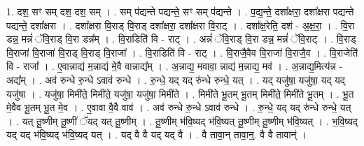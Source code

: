 \documentclass[17pt]{extarticle}
\begin{document}
1. दश॒ सꣳ सम् दश॒ दश॒ सम् । . सम् प॑द्यन्ते पद्यन्ते॒ सꣳ सम् प॑द्यन्ते । . प॒द्य॒न्ते॒ दशा᳚क्षरा॒ दशा᳚क्षरा पद्यन्ते पद्यन्ते॒ दशा᳚क्षरा । . दशा᳚क्षरा वि॒राड् वि॒राड् दशा᳚क्षरा॒ दशा᳚क्षरा वि॒राट् । . दशा᳚क्ष॒रेति॒ दश॑ - अ॒क्ष॒रा॒ । . वि॒रा डन्न॒ मन्नं॑ ॅवि॒राड् वि॒रा डन्न᳚म् । . वि॒राडिति॑ वि - राट् । . अन्नं॑ ॅवि॒राड् वि॒रा डन्न॒ मन्नं॑ ॅवि॒राट् । . वि॒राड् वि॒राजा॑ वि॒राजा॑ वि॒राड् वि॒राड् वि॒राजा᳚ । . वि॒राडिति॑ वि - राट् । . वि॒राजै॒वैव वि॒राजा॑ वि॒राजै॒व । . वि॒राजेति॑ वि - राजा᳚ । . ए॒वान्नाद्य॑ म॒न्नाद्य॑ मे॒वै वान्नाद्य᳚म् । . अ॒न्नाद्य॒ मवावा॒ न्नाद्य॑ म॒न्नाद्य॒ मव॑ । . अ॒न्नाद्य॒मित्य॑न्न - अद्य᳚म् । . अव॑ रुन्धे रु॒न्धे ऽवाव॑ रुन्धे । . रु॒न्धे॒ यद् यद् रु॑न्धे रुन्धे॒ यत् । . यद् यजु॑षा॒ यजु॑षा॒ यद् यद् यजु॑षा । . यजु॑षा॒ मिमी॑ते॒ मिमी॑ते॒ यजु॑षा॒ यजु॑षा॒ मिमी॑ते । . मिमी॑ते भू॒तम् भू॒तम् मिमी॑ते॒ मिमी॑ते भू॒तम् । . भू॒त मे॒वैव भू॒तम् भू॒त मे॒व । . ए॒वावा वै॒वै वाव॑ । . अव॑ रुन्धे रु॒न्धे ऽवाव॑ रुन्धे । . रु॒न्धे॒ यद् यद् रु॑न्धे रुन्धे॒ यत् । . यत् तू॒ष्णीम् तू॒ष्णीं ॅयद् यत् तू॒ष्णीम् । . तू॒ष्णीम् भ॑वि॒ष्यद् भ॑वि॒ष्यत् तू॒ष्णीम् तू॒ष्णीम् भ॑वि॒ष्यत् । . भ॒वि॒ष्यद् यद् यद् भ॑वि॒ष्यद् भ॑वि॒ष्यद् यत् । . यद् वै वै यद् यद् वै । . वै तावा॒न् तावा॒न्॒. वै वै तावान्॑ । \newline
\end{document}
